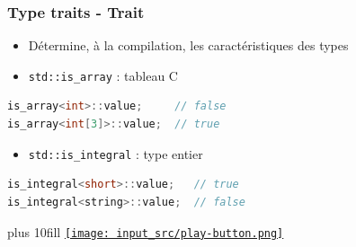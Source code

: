 \documentclass[C++.tex]{subfiles}
\begin{document}
\begin{frame}[fragile]
	\frametitle{Type traits - Trait}
	\begin{itemize}
		\item Détermine, à la compilation, les caractéristiques des types
		\item \lstinline|std::is_array| : tableau C
	\end{itemize}

	\begin{lstlisting}[language=C++]
is_array<int>::value;     // false
is_array<int[3]>::value;  // true\end{lstlisting}

	\begin{itemize}
		\item \lstinline|std::is_integral| : type entier
	\end{itemize}

	\begin{lstlisting}[language=C++]
is_integral<short>::value;   // true
is_integral<string>::value;  // false\end{lstlisting}

	\vskip 10mm plus 10fill
	\hfill
	\href{https://godbolt.org/#g:!((g:!((g:!((h:codeEditor,i:(filename:'1',fontScale:14,fontUsePx:'0',j:1,lang:c%2B%2B,selection:(endColumn:1,endLineNumber:20,positionColumn:1,positionLineNumber:20,selectionStartColumn:1,selectionStartLineNumber:20,startColumn:1,startLineNumber:20),source:'%23include+%3Ciostream%3E%0A%23include+%3Ctype_traits%3E%0A%0Atemplate+%3Cunsigned+n%3E%0Astruct+factorial+:+std::integral_constant%3Cint,+n+*+factorial%3Cn-1%3E::value%3E%0A%7B%7D%3B%0A%0Atemplate+%3C%3E%0Astruct+factorial%3C0%3E+:+std::integral_constant%3Cint,+1%3E%0A%7B%7D%3B%0A%0Aint+main()%0A%7B%0A++std::cout+%3C%3C+factorial%3C5%3E::value+%3C%3C+!'%5Cn!'%3B%0A%0A++std::cout+%3C%3C+std::boolalpha+%3C%3C+std::is_array%3Cint%3E::value+%3C%3C+!'%5Cn!'%3B%0A++std::cout+%3C%3C+std::boolalpha+%3C%3C+std::is_array%3Cint%5B3%5D%3E::value+%3C%3C+!'%5Cn!'%3B%0A%0A%7D%0A'),l:'5',n:'0',o:'C%2B%2B+source+%231',t:'0')),k:50,l:'4',n:'0',o:'',s:0,t:'0'),(g:!((h:executor,i:(argsPanelShown:'1',compilationPanelShown:'0',compiler:g112,compilerOutShown:'0',execArgs:'',execStdin:'',fontScale:14,fontUsePx:'0',j:1,lang:c%2B%2B,libs:!((name:boost,ver:'175')),options:'-std%3Dc%2B%2B11',source:1,stdinPanelShown:'1',tree:'1',wrap:'0'),l:'5',n:'0',o:'Executor+x86-64+gcc+11.2+(C%2B%2B,+Editor+%231)',t:'0')),header:(),k:50,l:'4',n:'0',o:'',s:0,t:'0')),l:'2',n:'0',o:'',t:'0')),version:4}{\texttt{[image: input\_src/play-button.png]}}
\end{frame}
\end{document}
